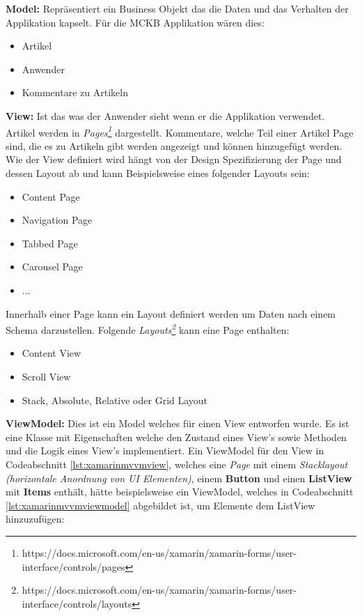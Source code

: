 	\textbf{Model:} Repräsentiert ein Business Objekt das die Daten und das Verhalten der Applikation kapselt. Für die MCKB Applikation wären dies:
	\begin{itemize}
		\setlength\itemsep{0em}
		\item Artikel
		\item Anwender
		\item Kommentare zu Artikeln
	\end{itemize}

	\textbf{View:} Ist das was der Anwender sieht wenn er die Applikation verwendet. Artikel werden in \textit{Pages\footnote{https://docs.microsoft.com/en-us/xamarin/xamarin-forms/user-interface/controls/pages}} dargestellt. Kommentare, welche Teil einer Artikel Page sind, die es zu Artikeln gibt werden angezeigt und können hinzugefügt werden. Wie der View definiert wird hängt von der Design Spezifizierung der Page und dessen Layout ab und kann Beispielsweise eines folgender Layouts sein:
	\begin{itemize}
		\setlength\itemsep{0em}
		\item Content Page
		\item Navigation Page
		\item Tabbed Page
		\item Carousel Page
		\item ...
	\end{itemize}
	Innerhalb einer Page kann ein Layout definiert werden um Daten nach einem Schema darzustellen. Folgende \textit{Layouts\footnote{https://docs.microsoft.com/en-us/xamarin/xamarin-forms/user-interface/controls/layouts}} kann eine Page enthalten:
	\begin{itemize}
		\setlength\itemsep{0em}
		\item Content View
		\item Scroll View
		\item Stack, Absolute, Relative oder Grid Layout
	\end{itemize}

	\textbf{ViewModel:} Dies ist ein Model welches für einen View entworfen wurde. Es ist eine Klasse mit Eigenschaften welche den Zustand eines View's sowie Methoden und die Logik eines View's implementiert.
	\newpage
	Ein ViewModel für den View in Codeabschnitt \ref{lst:xamarinmvvmview}, welches eine \textit{Page} mit einem \textit{Stacklayout (horizontale Anordnung von UI Elementen)}, einem \textbf{Button} und einen \textbf{ListView} mit \textbf{Items} enthält, hätte beispielsweise ein ViewModel, welches in Codeabschnitt \ref{lst:xamarinmvvmviewmodel} abgebildet ist, um Elemente dem ListView hinzuzufügen:\\

